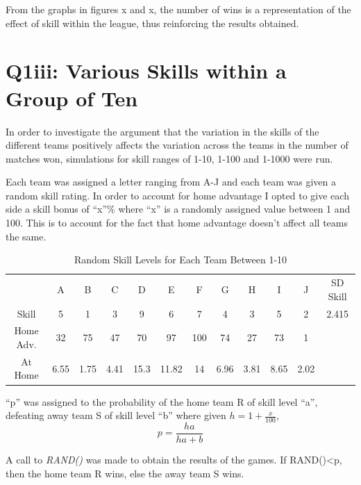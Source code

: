\documentclass[12pt]{article}
\begin{document}

From the graphs in figures x and x, the number of wins is a representation of the effect of skill within the league, thus reinforcing the results obtained.
\section{Q1iii: Various Skills within a Group of Ten}
In order to investigate the argument that the variation in the skills of the different teams positively affects the variation across the teams in the number of matches won, simulations for skill ranges of 1-10, 1-100 and 1-1000 were run.

Each team was assigned a letter ranging from A-J and each team was given a random skill rating. In order to account for home advantage I opted to give each side a skill bonus of “x”\% where “x” is a randomly assigned value between 1 and 100. This is to account for the fact that home advantage doesn’t affect all teams the same.

\begin{table}[h]
\centering
\begin{tabular}{cccccccccccc}
          & A    & B    & C    & D    & E     & F   & G    & H    & I    & J    & SD Skill \\
Skill     & 5    & 1    & 3    & 9    & 6     & 7   & 4    & 3    & 5    & 2    & 2.415    \\
Home Adv. & 32   & 75   & 47   & 70   & 97    & 100 & 74   & 27   & 73   & 1    &          \\
At Home   & 6.55 & 1.75 & 4.41 & 15.3 & 11.82 & 14  & 6.96 & 3.81 & 8.65 & 2.02 &         
\end{tabular}
\caption{Random Skill Levels for Each Team Between 1-10}
\end{table}

“p” was assigned to the probability of the home team R of skill level “a”, defeating away team S of skill level “b” where given $h=1+\frac{x}{100}$, $$p=\frac{ha}{ha+b}$$ 

A call to \emph{RAND()} was made to obtain the results of the games. If RAND()\textless p, then the home team R wins, else the away team S wins.
\end{document}
